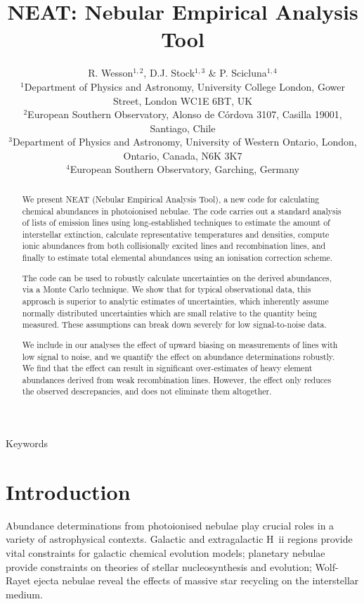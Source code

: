 \documentclass[useAMS,usenatbib]{mn2e}
\title[NEAT]{NEAT: Nebular Empirical Analysis Tool} %
\author[R. Wesson et al.]{R. Wesson$^{1,2}$, D.J. Stock$^{1,3}$ \& P. Scicluna$^{1,4}$\\
$^1$Department of Physics and Astronomy, University College London, Gower Street, London WC1E 6BT, UK\\
$^2$European Southern Observatory, Alonso de C\'ordova 3107, Casilla 19001, Santiago, Chile\\
$^3$Department of Physics and Astronomy, University of Western Ontario, London, Ontario, Canada, N6K 3K7\\
$^4$European Southern Observatory, Garching, Germany\\ %
}
\begin{document}
\date{}

\pagerange{\pageref{firstpage}--\pageref{lastpage}} 

\maketitle

\label{firstpage}

\begin{abstract}
We present NEAT (Nebular Empirical Analysis Tool), a new code for calculating chemical abundances in photoionised nebulae.  The code carries out a standard analysis of lists of emission lines using long-established techniques to estimate the amount of interstellar extinction, calculate representative temperatures and densities, compute ionic abundances from both collisionally excited lines and recombination lines, and finally to estimate total elemental abundances using an ionisation correction scheme.

The code can be used to robustly calculate uncertainties on the derived abundances, via a Monte Carlo technique.  We show that for typical observational data, this approach is superior to analytic estimates of uncertainties, which inherently assume normally distributed uncertainties which are small relative to the quantity being measured.  These assumptions can break down severely for low signal-to-noise data.

We include in our analyses the effect of upward biasing on measurements of lines with low signal to noise, and we quantify the effect on abundance determinations robustly.  We find that the effect can result in significant over-estimates of heavy element abundances derived from weak recombination lines.  However, the effect only reduces the observed descrepancies, and does not eliminate them altogether.

\end{abstract}

\begin{keywords}
Keywords
\end{keywords}

\section{Introduction}

Abundance determinations from photoionised nebulae play crucial roles in a variety of astrophysical contexts.  Galactic and extragalactic H~{\sc ii} regions provide vital constraints for galactic chemical evolution models; planetary nebulae provide constraints on theories of stellar nucleosynthesis and evolution; Wolf-Rayet ejecta nebulae reveal the effects of massive star recycling on the interstellar medium.
\end{document}
